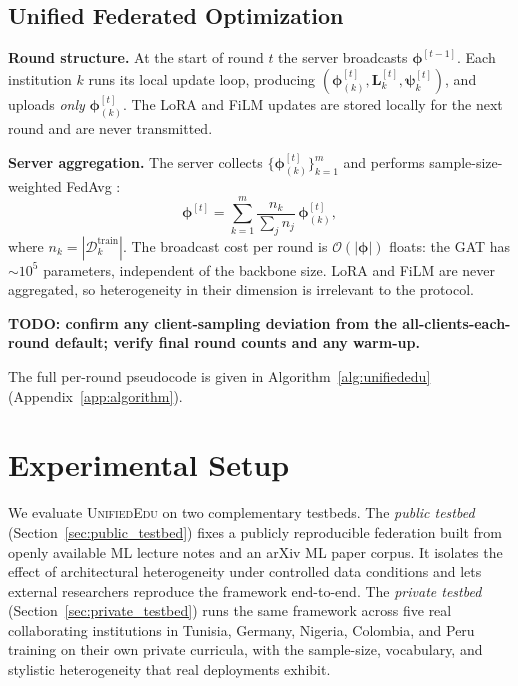 \documentclass[11pt]{article}
\theoremstyle{plain}
\theoremstyle{definition}
\theoremstyle{remark}
\newcommand{\red}[1]{\textcolor{myred}{\textbf{#1}}}
\newcommand{\UniEdu}{\textsc{UnifiedEdu}}
\begin{document}
\subsection{Unified Federated Optimization}
\label{sec:fed_opt}

\textbf{Round structure.}
At the start of round $t$ the server broadcasts
$\boldsymbol{\phi}^{[t-1]}$. Each institution $k$ runs
its local update loop, producing
$(\boldsymbol{\phi}^{[t]}_{(k)}, \mathbf{L}^{[t]}_k,
\boldsymbol{\psi}^{[t]}_k)$, and uploads
\emph{only} $\boldsymbol{\phi}^{[t]}_{(k)}$. The
LoRA and FiLM updates are stored locally for the next
round and are never transmitted.

\textbf{Server aggregation.}
The server collects
$\{\boldsymbol{\phi}^{[t]}_{(k)}\}_{k=1}^m$ and
performs sample-size-weighted FedAvg
\citep{mcmahan2017communication}:
\begin{equation}
  \boldsymbol{\phi}^{[t]}
  = \sum_{k=1}^m
    \frac{n_k}{\sum_j n_j}\,
    \boldsymbol{\phi}^{[t]}_{(k)},
  \label{eq:fedavg}
\end{equation}
where $n_k = |\mathcal{D}_k^{\text{train}}|$. The
broadcast cost per round is
$\mathcal{O}(|\boldsymbol{\phi}|)$ floats: the GAT
has $\sim$$10^5$ parameters, independent of the
backbone size. LoRA and FiLM are never aggregated, so
heterogeneity in their dimension is irrelevant to the
protocol.

\red{TODO: confirm any client-sampling deviation from the all-clients-each-round default; verify final round counts and any warm-up.}

The full per-round pseudocode is given in
Algorithm~\ref{alg:unifiededu}
(Appendix~\ref{app:algorithm}).

\section{Experimental Setup}
\label{sec:experiments}

We evaluate \UniEdu{} on two complementary testbeds.
The \emph{public testbed}
(Section~\ref{sec:public_testbed}) fixes a publicly
reproducible federation built from openly available
ML lecture notes and an arXiv ML paper corpus. It
isolates the effect of architectural heterogeneity
under controlled data conditions and lets external
researchers reproduce the framework end-to-end. The
\emph{private testbed} (Section~\ref{sec:private_testbed})
runs the same framework across five real
collaborating institutions in Tunisia, Germany,
Nigeria, Colombia, and Peru training on their own
private curricula, with the sample-size, vocabulary,
and stylistic heterogeneity that real
deployments exhibit.
\end{document}
